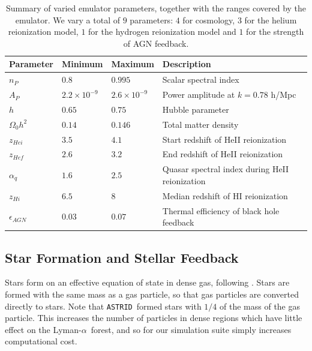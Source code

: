 \documentclass[a4paper,11pt]{article}
\newcommand{\Lya}{Lyman-$\alpha$}
\newcommand{\astrid}{\texttt{ASTRID}}
\begin{document}
\begin{table}
\begin{centering}
  \begin{tabular}{llll}
  \hline
  Parameter & Minimum & Maximum & Description \\
    \hline
    $n_P$  &  $0.8$  & $0.995$ & Scalar spectral index \\
    $A_P$  &  $2.2 \times 10^{-9}$  & $2.6 \times 10^{-9}$ & Power amplitude at $k = 0.78$ h/Mpc \\
    $h$    & $0.65$  & $0.75$ & Hubble parameter \\
    $\Omega_0 h^2$ & $0.14$ & $0.146$ & Total matter density \\
    $z_{Hei}$      & $3.5$  & $4.1$  & Start redshift of HeII reionization \\
    $z_{Hef}$      & $2.6$  & $3.2$  & End redshift of HeII reionization \\
    $\alpha_q$     & $1.6$  & $2.5$ & Quasar spectral index during HeII reionization  \\
    $z_{Hi}$        & $6.5$ & $8$   & Median redshift of HI reionization \\
    $\epsilon_{AGN}$ & $0.03$ & $0.07$ & Thermal efficiency of black hole feedback \\
    \hline
  \end{tabular}
  \caption{Summary of varied emulator parameters, together with the ranges covered by the emulator. We vary a total of $9$ parameters: $4$ for cosmology, $3$ for the helium reionization model, $1$ for the hydrogen reionization model and $1$ for the strength of AGN feedback.}
  \label{tab:emulatorparams}
  \end{centering}
\end{table}

\subsection{Star Formation and Stellar Feedback}
\label{sec:stellar}

Stars form on an effective equation of state in dense gas, following \cite{Springel:2003}. Stars are formed with the same mass as a gas particle, so that gas particles are converted directly to stars. Note that \astrid~formed stars with $1/4$ of the mass of the gas particle. This increases the number of particles in dense regions which have little effect on the \Lya~forest, and so for our simulation suite simply increases computational cost.
\end{document}
